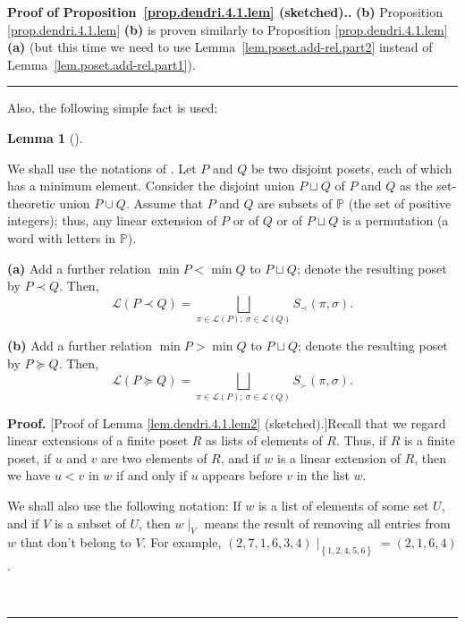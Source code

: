 \documentclass[numbers=enddot,12pt,final,onecolumn,notitlepage]{scrartcl}%
\theoremstyle{definition}
\newtheorem{lem}[theo]{Lemma}
\newenvironment{lemma}[1][]
{\begin{lem}[#1]\begin{leftbar}}
{\end{leftbar}\end{lem}}
\newenvironment{proof}[1][Proof]{\noindent\textbf{#1.} }{\ \rule{0.5em}{0.5em}}
\newenvironment{verlong}{}{}
\begin{document}
\begin{verlong}
\begin{proof}[Proof of Proposition~\ref{prop.dendri.4.1.lem} (sketched).]
\textbf{(b)} Proposition \ref{prop.dendri.4.1.lem} \textbf{(b)} is proven
similarly to Proposition \ref{prop.dendri.4.1.lem} \textbf{(a)}
(but this time we need to use Lemma~\ref{lem.poset.add-rel.part2}
instead of Lemma~\ref{lem.poset.add-rel.part1}).
\end{proof}

Also, the following simple fact is used:

\begin{lemma}
\label{lem.dendri.4.1.lem2}We shall use the notations of \cite[Section
5.2]{HopfComb}. Let $P$ and $Q$ be two disjoint posets, each of which has a
minimum element. Consider the disjoint union $P\sqcup Q$ of $P$ and $Q$ as the
set-theoretic union $P\cup Q$. Assume that $P$ and $Q$ are subsets of
$\mathbb{P}$ (the set of positive integers); thus, any linear extension of $P$
or of $Q$ or of $P\sqcup Q$ is a permutation (a word with letters in
$\mathbb{P}$).

\textbf{(a)} Add a further relation $\min P<\min Q$ to $P\sqcup Q$; denote the
resulting poset by $P\left.  \prec\right.  Q$. Then,
\[
\mathcal{L}\left(  P\left.  \prec\right.  Q\right)  =\bigsqcup_{\pi
\in\mathcal{L}\left(  P\right)  ;\ \sigma\in\mathcal{L}\left(  Q\right)
}S_{\prec}\left(  \pi,\sigma\right)  .
\]


\textbf{(b)} Add a further relation $\min P>\min Q$ to $P\sqcup Q$; denote the
resulting poset by $P\left.  \succeq\right.  Q$. Then,
\[
\mathcal{L}\left(  P\left.  \succeq\right.  Q\right)  =\bigsqcup_{\pi
\in\mathcal{L}\left(  P\right)  ;\ \sigma\in\mathcal{L}\left(  Q\right)
}S_{\succ}\left(  \pi,\sigma\right)  .
\]

\end{lemma}

\begin{proof}
[Proof of Lemma \ref{lem.dendri.4.1.lem2} (sketched).]Recall that we regard
linear extensions of a finite poset $R$ as lists of elements of $R$. Thus, if
$R$ is a finite poset, if $u$ and $v$ are two elements of $R$, and if $w$ is a
linear extension of $R$, then we have $u<v$ in $w$ if and only if $u$ appears
before $v$ in the list $w$.

We shall also use the following notation: If $w$ is a list of elements of some
set $U$, and if $V$ is a subset of $U$, then $w\mid_{V}$ means the result of
removing all entries from $w$ that don't belong to $V$. For example,
$\left. \left(
2,7,1,6,3,4\right)  \mid_{\left\{  1,2,4,5,6\right\}  } \right.
=\left( 2,1,6,4\right)  $.


\end{proof}
\end{verlong}
\end{document}

